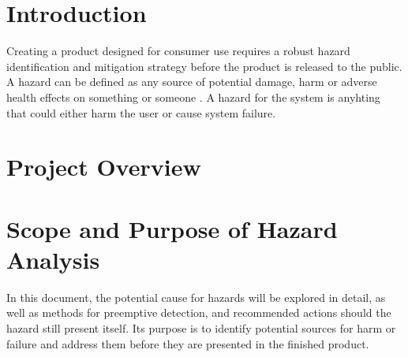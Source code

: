 \documentclass{article}
\begin{document}
\section{Introduction}{
    Creating a product designed for consumer use requires a robust hazard identification and mitigation strategy before the 
    product is released to the public. A hazard can be defined as any source of potential damage, harm or adverse health effects 
    on something or someone \cite{CCOHS}. A hazard for the \progname{} system is anyhting that could either harm the user or cause system failure.
}

\section{Project Overview}
\projectoverview

\section{Scope and Purpose of Hazard Analysis}{
    In this document, the potential cause for hazards will be explored in detail, as well as methods for preemptive detection, 
    and recommended actions should the hazard still present itself. Its purpose is to identify potential sources for harm or 
    failure and address them before they are presented in the finished product.
}
\end{document}
